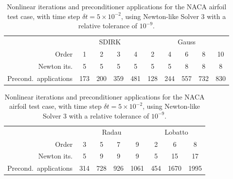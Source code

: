 \documentclass[review]{siamart}
\begin{document}
\begin{table}
	\centering
	\caption{Nonlinear iterations and preconditioner applications for the NACA airfoil test case, with time step $\delta t = 5 \times 10^{-2}$, using Newton-like Solver 3 with a relative tolerance of $10^{-9}$.}
	\label{tab:naca-iters}
	\begin{tabular}{r|cccc|ccccc}
		\toprule
		& \multicolumn{4}{c|}{SDIRK} & \multicolumn{5}{c}{Gauss} \\
		Order  & 1 & 2 & 3 & 4 & 2 & 4 & 6 & 8 & 10\\
		\midrule
		Newton its. & 5 & 5 & 5 & 5 & 5 & 5 & 8 & 8 & 8\\
		\midrule
		Precond.\ applications & 173 & 200 & 359 & 481 & 128 & 244 & 557 & 732 & 830\\
		\bottomrule
	\end{tabular}

	\vspace{\floatsep}

	\begin{tabular}{r|cccc|ccc}
		\toprule
		& \multicolumn{4}{c|}{Radau} & \multicolumn{3}{c}{Lobatto} \\
		Order  & 3 & 5 & 7 & 9 & 2 & 6 & 8\\
		\midrule
		Newton its. & 5 & 9 & 9 & 9 & 5 & 15 & 17\\
		\midrule
		Precond.\ applications & 314 & 728 & 926 & 1061 & 454 & 1670 & 1995\\
		\bottomrule
	\end{tabular}
\end{table}
\end{document}
